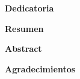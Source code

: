 



  \cleardoublepage {}
  \begin{center} \Large \textbf{Dedicatoria} \end{center}
  \dedicatoria


  \cleardoublepage
   
  \begin{center} \Large \textbf{Resumen} \end{center}
  \resumen

  \cleardoublepage
   
  \begin{center} \Large \textbf{Abstract} \end{center}
  \resumenIngles




  \cleardoublepage {}
  \begin{center} \Large \textbf{Agradecimientos} \end{center}
  \agradecimientos


  \cleardoublepage
  \tableofcontents
  \cleardoublepage
  \listoffigures
  \cleardoublepage
  \listoftables
  \cleardoublepage

  \normalsize

